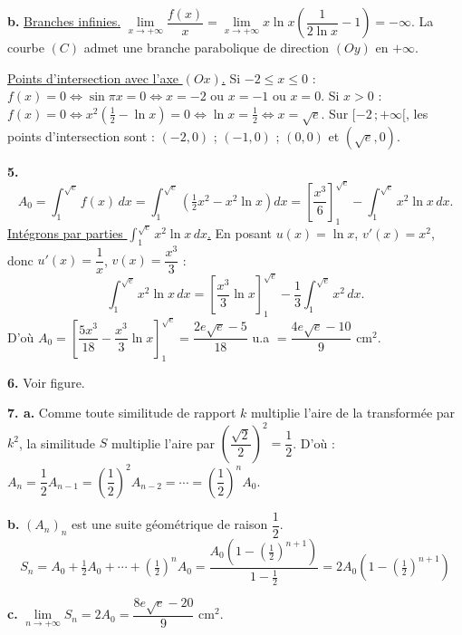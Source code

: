 \documentclass[11pt]{article}
\begin{document}
\textbf{b.} \underline{Branches infinies.} $\lim\limits_{x\to+\infty}\dfrac{f(x)}{x} = \lim\limits_{x\to+\infty} x\ln x\left(\dfrac{1}{2\ln x} - 1\right) = -\infty$. La courbe $(C)$ admet une branche parabolique de direction $(Oy)$ en $+\infty$.

\underline{Points d'intersection avec l'axe $(Ox)$.} Si $-2 \le x \le 0$ : $f(x) = 0 \Leftrightarrow \sin\pi x = 0 \Leftrightarrow x = -2$ ou $x = -1$ ou $x = 0$. Si $x > 0$ : $f(x) = 0 \Leftrightarrow x^2\left(\tfrac{1}{2} - \ln x\right) = 0 \Leftrightarrow \ln x = \tfrac{1}{2} \Leftrightarrow x = \sqrt{e}$. Sur $[-2\,;+\infty[$, les points d'intersection sont : $(-2, 0)$ ; $(-1, 0)$ ; $(0, 0)$ et $(\sqrt{e}, 0)$.

\begin{center}
\end{center}

\textbf{5.}
\[ A_0 = \int_1^{\sqrt{e}} f(x)\,dx = \int_1^{\sqrt{e}}\left(\tfrac{1}{2}x^2 - x^2\ln x\right)dx = \left[\frac{x^3}{6}\right]_1^{\sqrt{e}} - \int_1^{\sqrt{e}} x^2\ln x\,dx. \]
\underline{Intégrons par parties $\displaystyle\int_1^{\sqrt{e}} x^2\ln x\,dx$.} En posant $u(x) = \ln x$, $v'(x) = x^2$, donc $u'(x) = \dfrac{1}{x}$, $v(x) = \dfrac{x^3}{3}$ :
\[ \int_1^{\sqrt{e}} x^2\ln x\,dx = \left[\frac{x^3}{3}\ln x\right]_1^{\sqrt{e}} - \frac{1}{3}\int_1^{\sqrt{e}} x^2\,dx. \]
D'où $A_0 = \left[\dfrac{5x^3}{18} - \dfrac{x^3}{3}\ln x\right]_1^{\sqrt{e}} = \dfrac{2e\sqrt{e} - 5}{18}$ u.a $= \dfrac{4e\sqrt{e} - 10}{9}$ cm$^2$.

\textbf{6.} Voir figure.

\textbf{7. a.} Comme toute similitude de rapport $k$ multiplie l'aire de la transformée par $k^2$, la similitude $S$ multiplie l'aire par $\left(\dfrac{\sqrt{2}}{2}\right)^2 = \dfrac{1}{2}$. D'où : $A_n = \dfrac{1}{2}A_{n-1} = \left(\dfrac{1}{2}\right)^2 A_{n-2} = \cdots = \left(\dfrac{1}{2}\right)^n A_0$.

\textbf{b.} $(A_n)_n$ est une suite géométrique de raison $\dfrac{1}{2}$.
\[ S_n = A_0 + \tfrac{1}{2}A_0 + \cdots + \left(\tfrac{1}{2}\right)^n A_0 = \frac{A_0\left(1 - (\tfrac{1}{2})^{n+1}\right)}{1 - \tfrac{1}{2}} = 2A_0\left(1 - (\tfrac{1}{2})^{n+1}\right) \]

\textbf{c.} $\lim\limits_{n\to+\infty} S_n = 2A_0 = \dfrac{8e\sqrt{e} - 20}{9}$ cm$^2$.
\end{document}
